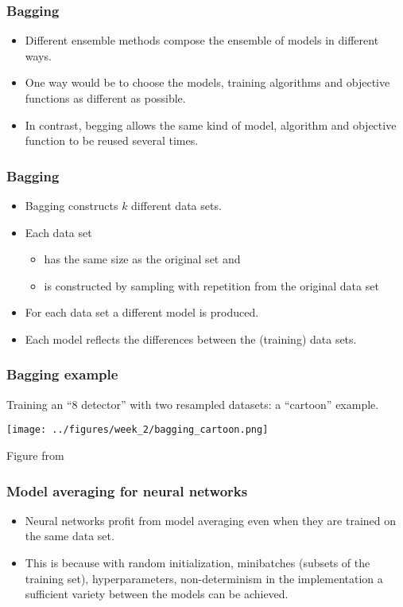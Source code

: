\documentclass[notes]{beamer}          %
\begin{document}
\begin{frame}
\frametitle{Bagging}
    \begin{itemize}
        \item Different ensemble methods compose the ensemble of models in different ways.
        \item One way would be to choose the models, training algorithms and objective functions as different as possible.
        \item In contrast, begging allows the same kind of model, algorithm and objective function to be reused several times.
    \end{itemize}

\end{frame}

\begin{frame}
\frametitle{Bagging}
    \begin{itemize}
        \item Bagging constructs $k$ different data sets.
        \item Each data set
        \begin{itemize}
            \item has the same size as the original set and
            \item is constructed by sampling with repetition from the original data set
        \end{itemize}
        \item For each data set a different model is produced.
        \item Each model reflects the differences between the (training) data sets.
    \end{itemize}

\end{frame}

\begin{frame}
\frametitle{Bagging example}
    Training an ``8 detector'' with two resampled datasets: a ``cartoon'' example.
    \begin{center}
        \texttt{[image: ../figures/week\_2/bagging\_cartoon.png]}
    \end{center}
    \tiny{Figure from \cite{deeplearning}}
\end{frame}

\begin{frame}
\frametitle{Model averaging for neural networks}
    \begin{itemize}
        \item Neural networks profit from model averaging even when they are trained on the same data set.
        \item This is because with random initialization, minibatches (subsets of the training set), hyperparameters, non-determinism in the implementation a sufficient variety between the models can be achieved.
    \end{itemize}
\end{frame}
\end{document}
